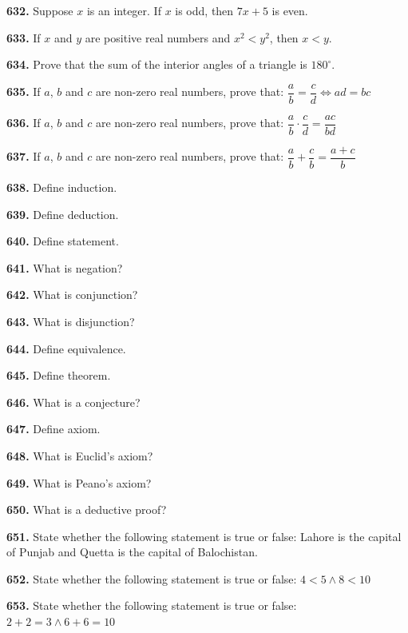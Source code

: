 \documentclass[11pt]{article}
\begin{document}
\bigskip
\noindent\textbf{632.} Suppose $x$ is an integer. If $x$ is odd, then $7x+5$ is even.

\bigskip
\noindent\textbf{633.} If $x$ and $y$ are positive real numbers and $x^2<y^2$, then $x<y$.

\bigskip
\noindent\textbf{634.} Prove that the sum of the interior angles of a triangle is $180^{\circ}$.

\bigskip
\noindent\textbf{635.} If $a$, $b$ and $c$ are non-zero real numbers, prove that: $\dfrac{a}{b}=\dfrac{c}{d} \Leftrightarrow ad=bc$

\bigskip
\noindent\textbf{636.} If $a$, $b$ and $c$ are non-zero real numbers, prove that: $\dfrac{a}{b}\cdot\dfrac{c}{d}=\dfrac{ac}{bd}$

\bigskip
\noindent\textbf{637.} If $a$, $b$ and $c$ are non-zero real numbers, prove that: $\dfrac{a}{b}+\dfrac{c}{b}=\dfrac{a+c}{b}$

\bigskip
\noindent\textbf{638.} Define induction.

\bigskip
\noindent\textbf{639.} Define deduction.

\bigskip
\noindent\textbf{640.} Define statement.

\bigskip
\noindent\textbf{641.} What is negation?

\bigskip
\noindent\textbf{642.} What is conjunction?

\bigskip
\noindent\textbf{643.} What is disjunction?

\bigskip
\noindent\textbf{644.} Define equivalence.

\bigskip
\noindent\textbf{645.} Define theorem.

\bigskip
\noindent\textbf{646.} What is a conjecture?

\bigskip
\noindent\textbf{647.} Define axiom.

\bigskip
\noindent\textbf{648.} What is Euclid's axiom?

\bigskip
\noindent\textbf{649.} What is Peano's axiom?

\bigskip
\noindent\textbf{650.} What is a deductive proof?

\bigskip
\noindent\textbf{651.} State whether the following statement is true or false: Lahore is the capital of Punjab and Quetta is the capital of Balochistan.

\bigskip
\noindent\textbf{652.} State whether the following statement is true or false: $4<5 \wedge 8<10$

\bigskip
\noindent\textbf{653.} State whether the following statement is true or false: $2+2=3 \wedge 6+6=10$
\end{document}
